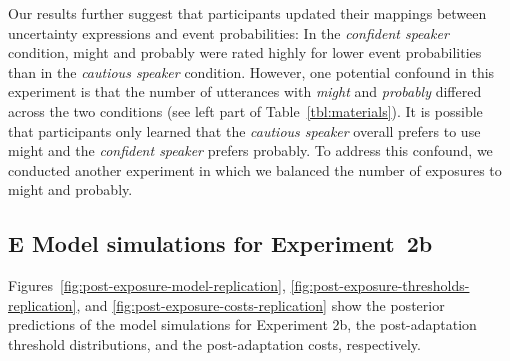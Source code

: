\documentclass[man, floatsintext]{apa6}
\begin{document}

Our results further suggest that participants updated their mappings between uncertainty expressions and event probabilities: In the {\it confident speaker} condition, {\sc might} and {\sc probably} were rated highly for lower event probabilities than in the {\it cautious speaker} condition. However, one potential confound in this experiment is that the number of utterances with \textit{might} and \textit{probably} differed across the two conditions (see left part of Table~\ref{tbl:materials}). It is possible that participants only learned that the {\it cautious speaker} overall prefers to use {\sc might} and the {\it confident speaker} prefers {\sc probably}. To address this confound, we conducted another experiment in which we balanced the number of exposures to {\sc might} and {\sc probably}.



\subsection*{E Model simulations for Experiment~2b}

Figures~\ref{fig:post-exposure-model-replication}, \ref{fig:post-exposure-thresholds-replication}, and \ref{fig:post-exposure-costs-replication} show the posterior predictions
of the model simulations for Experiment 2b, the post-adaptation threshold distributions, and the post-adaptation costs, respectively. 
\end{document}
